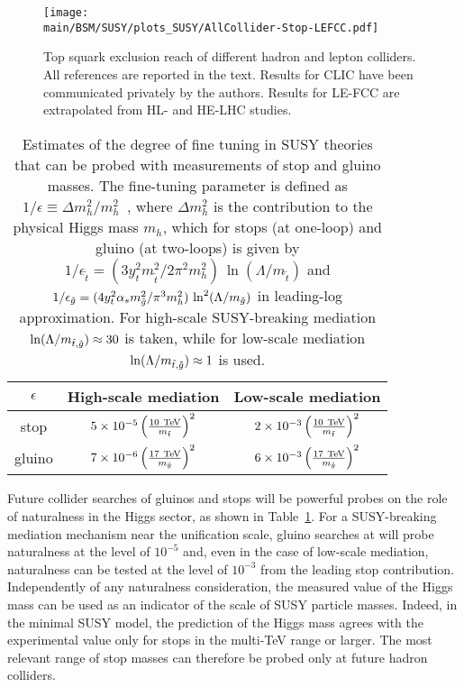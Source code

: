 \documentclass[../report.tex]{subfiles}
\providecommand{\main}{..}
\begin{document}
\begin{figure}[htb]
    \centering
\texttt{[image: \\main/BSM/SUSY/plots\_SUSY/AllCollider-Stop-LEFCC.pdf]}
    \caption{
    Top squark exclusion reach of different hadron and lepton colliders. All references are reported in the text. Results for CLIC have been communicated privately by the authors. Results for LE-FCC are extrapolated from HL- and HE-LHC studies. }
\label{fig:SUSY_stop}
\end{figure}


\begin{table}[t]
    \caption{Estimates of the degree of fine tuning in SUSY theories that can be probed with measurements of stop and gluino masses. The fine-tuning parameter is defined as $1/\epsilon \equiv \Delta m_h^2 / m_h^2$~\cite{Barbieri:1987fn}, where $\Delta m_h^2$ is the contribution to the physical Higgs mass $m_h$, which for stops (at one-loop) and gluino (at two-loops) is given by $1/\epsilon_{\tilde t}=(3y_t^2m_{\tilde t}^2/2\pi^2 m_h^2)\, \ln ({\Lambda }/ m_{\tilde t})$ and $1/\epsilon_{\tilde{g}}=(4y_t^2\alpha_s m_{\tilde{g}}^2/\pi^3 m_h^2)\, \ln^2 ({\Lambda }/ m_{\tilde{g}})$ in leading-log approximation. For high-scale SUSY-breaking mediation $\ln ({\Lambda }/ m_{\tilde t, \tilde{g}})\approx 30$ is taken, while for low-scale mediation $\ln ({\Lambda }/ m_{\tilde t, \tilde{g}})\approx 1$ is used.}
    \centering
               {\setlength{\extrarowheight}{14pt}
    \begin{tabular}{c||c|c}
       $\epsilon$  & High-scale mediation & Low-scale mediation \\
         \hline
         \hline 
         stop & $5\times 10^{-5} \left( \frac{\rm 10~TeV}{m_{\tilde t}}\right)^2$
           & $2\times 10^{-3} \left( \frac{\rm 10~TeV}{m_{\tilde t}}\right)^2$ \\
        gluino & $7\times 10^{-6} \left( \frac{\rm 17~TeV}{m_{\tilde{g}}}\right)^2$
           & $6\times 10^{-3} \left( \frac{\rm 17~TeV}{m_{\tilde{g}}}\right)^2$
    \end{tabular}}
    \label{tab:susyft}
\end{table}

Future collider searches of gluinos and stops will be powerful probes on the role of naturalness in the Higgs sector, as shown in Table~\ref{tab:susyft}. For a SUSY-breaking mediation mechanism near the unification scale, gluino searches at \FCChh will probe naturalness at the level of $10^{-5}$ and, even in the case of low-scale mediation, naturalness can be tested at the level of $10^{-3}$ from the leading stop contribution. 
Independently of any naturalness consideration, the measured value of the Higgs mass can be used as an indicator of the scale of SUSY particle masses. Indeed, in the minimal SUSY model, the prediction of the Higgs mass agrees with the experimental value only for stops in the multi-TeV range or larger. The most relevant range of stop masses can therefore be probed only at future hadron colliders. %
\end{document}
